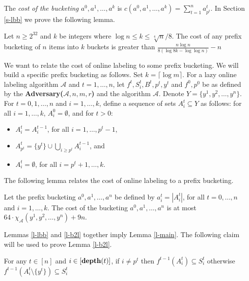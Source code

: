 \documentclass[runningheads,a4paper]{llncs}
\newcommand{\A}{\mathcal{A}}
\newcommand{\depth}{{\rm {\bf depth}}}
\begin{document}
The \emph{cost of the bucketing $a^0,a^1,\dots,a^k$} is $c(a^0,a^1,\dots,a^k) = \sum_{t=1}^n a^t_{p^{t}}$. In Section \ref{s-lbb}
we prove the following lemma.

\begin{lemma}\label{l-lbb}
Let $n \ge 2^{32}$ and $k$ be integers where $\log n \le k \le \sqrt[4]{n}/8$.
The cost of any prefix bucketing of $n$ items into $k$ buckets is greater than $\frac{n \log n}{8 (\log 8k - \log \log n)} - n$
\end{lemma}

We want to relate the cost of online labeling to some prefix bucketing. We will build a specific prefix
bucketing as follows. Set $k=\lceil \log m\rceil$.
For a lazy online labeling algorithm $\A$ and $t=1,\dots,n$, let $f^t,S^t_i,B^t,p^{t},y^t$ and $f^0,p^0$ be as 
defined by the {\bf Adversary($\A,n,m,r$)} and the algorithm $\A$. Denote $Y=\{y^1,y^2,\dots,y^n\}$.
For $t=0,1,\dots,n$ and $i=1,\dots,k$, define a sequence of sets $A^t_i \subseteq Y$ as follows:
for all $i=1,\dots,k$, $A^0_i = \emptyset$, and for $t>0$:
\begin{itemize}
\item $A^t_i = A^{t-1}_i$, for all $i=1,\dots,p^{t}-1$, 
\item $A^t_{p^{t}} = \{y^t\} \cup \bigcup_{i\ge p^{t}} A^{t-1}_i$, and
\item $A^t_i = \emptyset$, for all $i=p^{t}+1,\dots, k$.
\end{itemize} 

The following lemma relates the cost of online labeling to a prefix bucketing.
 
\begin{lemma}\label{l-b2l}
Let the prefix bucketing $a^0,a^1,\dots,a^n$ be defined by $a^t_i = |A^t_i|$, for all $t=0,\dots,n$ and $i=1,\dots,k$.
The cost of the bucketing $a^0,a^1,\dots,a^n$ is at most $64 \cdot \chi_\A(y^1,y^2,\dots,y^n) + 9n$.
\end{lemma}

Lemmas \ref{l-lbb} and \ref{l-b2l} together imply Lemma \ref{l-main}. The following claim will be used to prove Lemma  \ref{l-b2l}.

\begin{lemma}\label{l-p2}
For any $t\in[n]$ and $i\in [\depth(t)]$,  if $i\not=p^t$ then $f^{t-1}(A^t_i) \subseteq S^t_i$ otherwise
$f^{t-1}(A^t_i \setminus \{y^t\}) \subseteq S^t_i$ 
\end{lemma}
\end{document}
